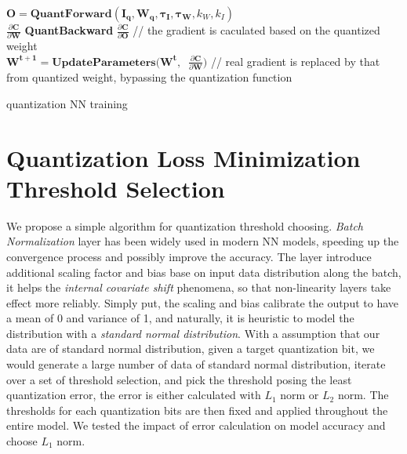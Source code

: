 \begin{algorithm}
    \SetAlgoLined
        $\boldsymbol{O}=\textbf{QuantForward}(\boldsymbol{I_q},\boldsymbol{W_q},\boldsymbol{\tau_I},\boldsymbol{\tau_W},k_W,k_I )$ \\
        $\frac{\partial \boldsymbol{C} }{\partial \boldsymbol{W}}$
        \text{=\ }\textbf{QuantBackward}\text{(\ }  $\frac{\partial\boldsymbol{C}}{\partial\boldsymbol{O}}$
        // the gradient is caculated based on the quantized weight \\
        $\boldsymbol{W^{t+1}}=\textbf{UpdateParameters}(\boldsymbol{W^t},\ $ $\frac{\partial\boldsymbol{C}}{\partial\boldsymbol{W}})$ 
        // real gradient is replaced by that from quantized weight, bypassing the quantization function
    \caption{quantization NN training}
    \label{alg:NN_train}
\end{algorithm}

\section{Quantization Loss Minimization Threshold Selection}
We propose a simple algorithm for quantization threshold choosing. \textit{Batch Normalization} layer \cite{BatchNormalization} has been widely used in modern NN models, speeding up the convergence process and possibly improve the accuracy. The layer introduce additional scaling factor and bias base on input data distribution along the batch, it helps the \textit{internal covariate shift} phenomena, so that non-linearity layers take effect more reliably. Simply put, the scaling and bias calibrate the output to have a mean of 0 and variance of 1, and naturally, it is heuristic to model the distribution with a \textit{standard normal distribution}. With a assumption that our data are of standard normal distribution, given a target quantization bit, we would generate a large number of data of standard normal distribution, iterate over a set of threshold selection, and pick the threshold posing the least quantization error, the error is either calculated with \textit{$L_1$} norm or \textit{$L_2$} norm. The thresholds for each quantization bits are then fixed and applied throughout the entire model. We tested the impact of error calculation on model accuracy and choose \textit{$L_1$} norm. 

